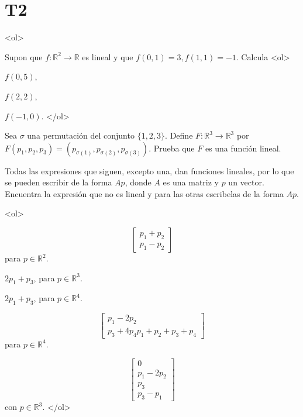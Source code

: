 \documentclass{article}
\theoremstyle{definition}
\begin{document}
  \section*{T2}
  
  <ol>
       \item Supon que $f:\mathbb{R}^2 \to \mathbb{R}$ es lineal y que $f(0,1)=3, f(1,1)=-1$. Calcula
       <ol>
       \item $f(0,5)$,
       \item $f(2,2)$,
         \item $f(-1,0)$.
       </ol>

       \item Sea $\sigma$ una permutación del conjunto $\{1,2,3\}$. Define $F:\mathbb{R}^3\to \mathbb{R}^3$ por
  $F(p_1,p_2,p_3)=(p_{\sigma(1)}, p_{\sigma(2)}, p_{\sigma(3)})$. Prueba que $F$ es una función lineal.


       \item Todas las expresiones que siguen, excepto una, dan funciones lineales, por lo que se pueden escribir de la forma $Ap$, donde $A$ es una matriz y $p$ un vector. Encuentra la expresión que no es lineal y para las otras  escribelas  de la forma $Ap$.

       
       <ol>
       \item 
       $$
       \left[
       \begin{array}{cc}
       p_1+p_2 \\
       p_1-p_2
       \end{array}
       \right]	
       $$
       para $p\in \mathbb{R}^2$.
       \item $2p_1+p_3$, para  $p\in \mathbb{R}^3$.
       \item $2p_1+p_3$, para $p\in \mathbb{R}^4$.
       \item 
       $$
       \left[
       \begin{array}{c}
       p_1-2p_2 \\
       p_3+4p_4
       p_1+p_2+p_3+p_4
       \end{array}
       \right]
       $$
       para $p\in \mathbb{R}^4$.
       
	\item 
	$$
	\left[
	\begin{array}{c}
	0 \\
	p_1-2p_2\\
	p_3 \\
	p_3-p_1
	\end{array}
	\right]
	$$       
       con $p\in\mathbb{R}^3$.
       </ol>
\end{document}
